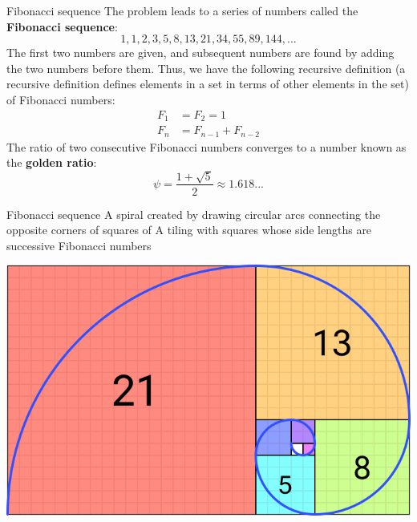 \begin{frame}{Fibonacci sequence}
\small
The problem leads to a series of numbers called the \textbf{Fibonacci sequence}:
\begin{equation*}
1, 1, 2, 3, 5, 8, 13, 21, 34, 55, 89, 144, ...
\end{equation*}
The first two numbers are given, and subsequent numbers are found by adding the two numbers before them. Thus, we have the following recursive definition (a recursive definition defines elements in a set in terms of other elements in the set) of Fibonacci numbers:
\begin{align*}
   F_{1} &= F_{2} = 1 \\ 
   F_{n} &= F_{n-1} + F_{n-2}
 \end{align*}
The ratio of two consecutive Fibonacci numbers converges to a number known as the \textbf{golden ratio}:
\begin{equation}
  \psi = \frac{1 + \sqrt{5}}{2} \approx 1.618 ...
\end{equation}
\end{frame}

\begin{frame}{Fibonacci sequence}    
A spiral created by drawing circular arcs connecting the opposite corners of squares of A tiling with squares whose side lengths are successive Fibonacci numbers
\vfill

\begin{center}
   \includegraphics[scale = 0.35]{lesson_1/images/fibonacci_spiral.png} 
\end{center}

\end{frame}


